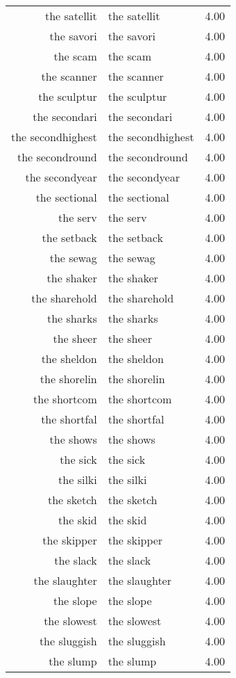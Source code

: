 \begin{table}[ht]
\begin{tabular}{rlr}
  the satellit & the satellit & 4.00 \\ 
  the savori & the savori & 4.00 \\ 
  the scam & the scam & 4.00 \\ 
  the scanner & the scanner & 4.00 \\ 
  the sculptur & the sculptur & 4.00 \\ 
  the secondari & the secondari & 4.00 \\ 
  the secondhighest & the secondhighest & 4.00 \\ 
  the secondround & the secondround & 4.00 \\ 
  the secondyear & the secondyear & 4.00 \\ 
  the sectional & the sectional & 4.00 \\ 
  the serv & the serv & 4.00 \\ 
  the setback & the setback & 4.00 \\ 
  the sewag & the sewag & 4.00 \\ 
  the shaker & the shaker & 4.00 \\ 
  the sharehold & the sharehold & 4.00 \\ 
  the sharks & the sharks & 4.00 \\ 
  the sheer & the sheer & 4.00 \\ 
  the sheldon & the sheldon & 4.00 \\ 
  the shorelin & the shorelin & 4.00 \\ 
  the shortcom & the shortcom & 4.00 \\ 
  the shortfal & the shortfal & 4.00 \\ 
  the shows & the shows & 4.00 \\ 
  the sick & the sick & 4.00 \\ 
  the silki & the silki & 4.00 \\ 
  the sketch & the sketch & 4.00 \\ 
  the skid & the skid & 4.00 \\ 
  the skipper & the skipper & 4.00 \\ 
  the slack & the slack & 4.00 \\ 
  the slaughter & the slaughter & 4.00 \\ 
  the slope & the slope & 4.00 \\ 
  the slowest & the slowest & 4.00 \\ 
  the sluggish & the sluggish & 4.00 \\ 
  the slump & the slump & 4.00 \\ 

\end{tabular}
\end{table}
